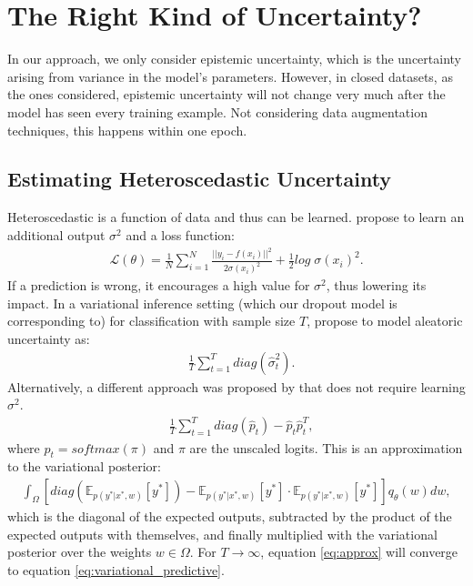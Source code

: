 \documentclass[a4paper,cleardoubleempty,BCOR1cm, 11pt]{report}
\begin{document}
\section{The Right Kind of Uncertainty?}
In our approach, we only consider epistemic uncertainty, which is the uncertainty arising from variance in the model's parameters. However, in closed datasets, as the ones considered, epistemic uncertainty will not change very much after the model has seen every training example. Not considering data augmentation techniques, this happens within one epoch. %


\subsection{Estimating Heteroscedastic Uncertainty}
Heteroscedastic is a function of data and thus can be learned. \citet{kendall2017uncertainties} propose to learn an additional output $\sigma^2$ and a loss function:
\begin{align}
\mathcal{L}(\theta) = \frac{1}{N}\sum_{i=1}^{N} \frac{||y_i-f(x_i)||^2}{2\sigma(x_i)^2} + \frac{1}{2}log\;\sigma(x_i)^2.
\end{align}
If a prediction is wrong, it encourages a high value for $\sigma^2$, thus lowering its impact. In a variational inference setting (which our dropout model is corresponding to) for classification with sample size $T$, \citet{kendall2017uncertainties} propose to model aleatoric uncertainty as:
\begin{align}
&\frac{1}{T}\sum_{t=1}^{T}diag(\hat{\sigma}_t^2).
\end{align}
Alternatively, a different approach was proposed by \citet{kwon2020uncertainty} that does not require learning $\sigma^2$. 
\begin{align}
\label{eq:approx}
&\frac{1}{T}\sum_{t=1}^{T}diag(\hat{p}_t) - \hat{p}_t\hat{p}_t^T,
\end{align}
where $\hat{p}_t = softmax(\pi)$  and $\pi$ are the unscaled logits.
This is an approximation to the variational posterior:
\begin{align}
\label{eq:variational_predictive}
\int_{\Omega}\left[ diag (\mathbb{E}_{p(y^*|x^*,w)}[y^*]) -\mathbb{E}_{p(y^*|x^*,w)}[y^*] \cdot \mathbb{E}_{p(y^*|x^*,w)}[y^*] \right]q_{\theta}(w)dw,
\end{align}
which is the diagonal of the expected outputs, subtracted by the product of the expected outputs with themselves, and finally multiplied with the variational posterior over the weights $w\in \Omega$.  For $T\rightarrow \infty$, equation \ref{eq:approx} will converge to equation \ref{eq:variational_predictive}.
\end{document}
